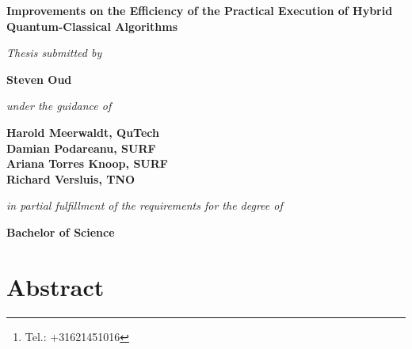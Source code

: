 \documentclass[a4paper,11pt]{report}
\title{\thesistitle}
\author{\authorname\thanks{Tel.: +31621451016}\\
    500776959\\
    \\
    \emph{Faculty of Computer Science, Information Technology,}\\
    \emph{Business IT and Management}\\
    Software Engineering
    \\
    \\
    \\
    Advisor: Marten Teitsma
    \\
    \\
    \\
    Amsterdam University of Applied Sciences\\
    \today}
\date{}
\renewcommand{\thefootnote}{\fnsymbol{footnote}}
\newcommand{\thesistitle}{Improvements on the Efficiency of the Practical Execution of Hybrid Quantum-Classical Algorithms}
\newcommand{\authorname}{Steven Oud}
\begin{document}
\begin{titlepage}
\thispagestyle{empty}
    \begin{center}
        \vspace*{1cm}
        \textbf{\LARGE \thesistitle}
        
        \vspace{1.5cm}
        \textit{\large Thesis submitted by}

        \vspace{0.75cm}
        
        \textbf{\large \authorname}
        
        \vspace{0.75cm}
        \textit{\large under the guidance of}
        
        \vspace{0.75cm}
        \textbf{\large Harold Meerwaldt, QuTech\\
            Damian Podareanu, SURF\\
            Ariana Torres Knoop, SURF\\
            Richard Versluis, TNO}
        
        \vspace{0.75cm}
        \textit{\large in partial fulfillment of the requirements for the degree of}
        
        \vspace{0.75cm}
        \textbf{\large Bachelor of Science}
        
    \end{center}
\end{titlepage}

\maketitle

\renewcommand{\thefootnote}{\arabic{footnote}}

\chapter*{Abstract}
\lipsum[5]

\glsunsetall
\cleardoublepage
\tableofcontents

\cleardoublepage
\listoffigures

\cleardoublepage
\listoftables
\glsresetall

\cleardoublepage
{}











\cleardoublepage
\printbibliography[heading=bibintoc]

\cleardoublepage
\printnoidxglossaries

\begin{appendices}
\appendix

\end{appendices}
\end{document}
